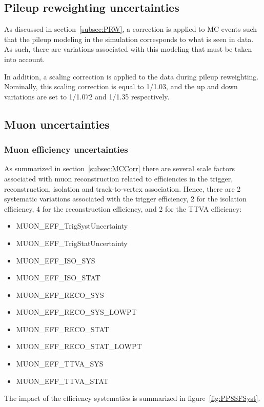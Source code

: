 \subsection{Pileup reweighting uncertainties}
As discussed in section~\ref{subsec:PRW}, a correction is applied to MC events such that the pileup modeling in the simulation corresponds to what is seen in data. As such, there are variations associated with this modeling
that must be taken into account.

In addition, a scaling correction is applied to the data during pileup reweighting. Nominally, this scaling correction is equal to 1/1.03, and the up and down variations are set to 1/1.072 and 1/1.35 respectively.

\subsection{Muon uncertainties}

\subsubsection{Muon efficiency uncertainties}
As summarized in section~\ref{subsec:MCCorr} there are several scale factors associated with muon reconstruction related to efficiencies in the trigger, reconstruction, isolation and track-to-vertex association.
Hence, there are 2 systematic variations associated with the trigger efficiency, 2 for the isolation efficiency, 4 for the reconstruction efficiency, and 2 for the TTVA efficiency:
\begin{itemize}
  \item MUON\_EFF\_TrigSystUncertainty
  \item MUON\_EFF\_TrigStatUncertainty
  \item MUON\_EFF\_ISO\_SYS
  \item MUON\_EFF\_ISO\_STAT
  \item MUON\_EFF\_RECO\_SYS
  \item MUON\_EFF\_RECO\_SYS\_LOWPT
  \item MUON\_EFF\_RECO\_STAT
  \item MUON\_EFF\_RECO\_STAT\_LOWPT
  \item MUON\_EFF\_TTVA\_SYS
  \item MUON\_EFF\_TTVA\_STAT
\end{itemize}

The impact of the efficiency systematics is summarized in figure~\ref{fig:PP8SFSyst}.

